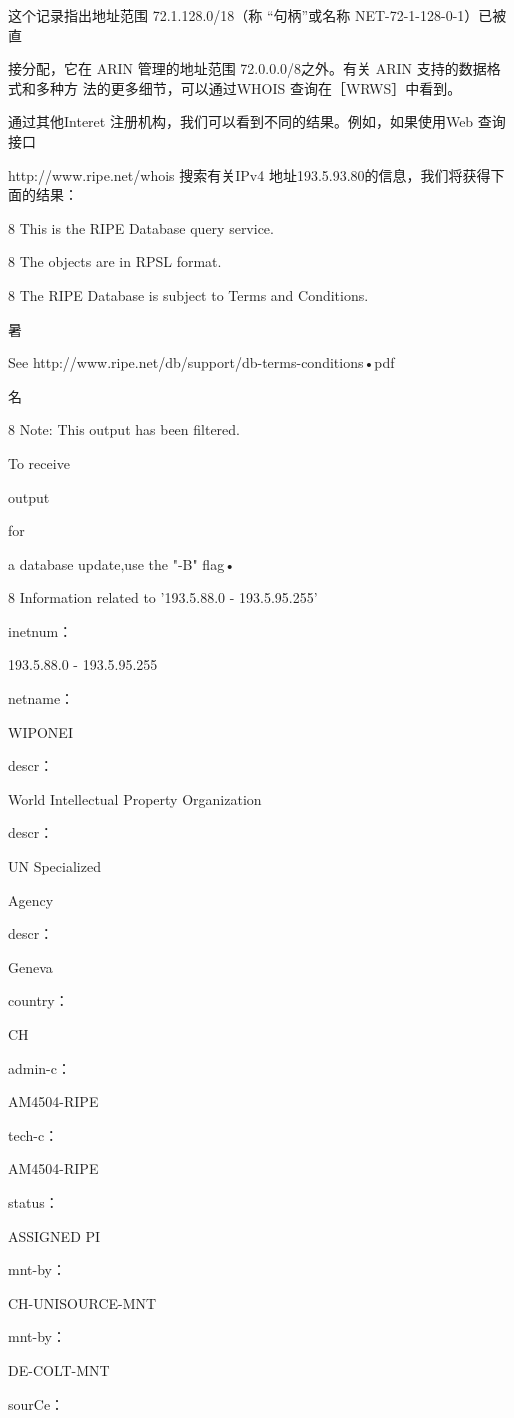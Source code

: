 这个记录指出地址范围 72.1.128.0/18（称 “句柄”或名称 NET-72-1-128-0-1）已被直

接分配，它在 ARIN 管理的地址范围 72.0.0.0/8之外。有关 ARIN 支持的数据格式和多种方
法的更多细节，可以通过WHOIS 查询在［WRWS］中看到。

通过其他Interet 注册机构，我们可以看到不同的结果。例如，如果使用Web 查询接口

http://www.ripe.net/whois 搜索有关IPv4 地址193.5.93.80的信息，我们将获得下面的结果：

8 This is the RIPE Database query service.

8 The objects are in RPSL format.

8 The RIPE Database is subject to Terms and Conditions.

暑

See http://www.ripe.net/db/support/db-terms-conditions•pdf

名

8 Note: This output has been filtered.

To receive

output

for

a database update,use the "-B" flag•

8 Information related to '193.5.88.0 - 193.5.95.255'

inetnum：

193.5.88.0 - 193.5.95.255

netname：

WIPONEI

descr：

World Intellectual Property Organization

descr：

UN Specialized

Agency

descr：

Geneva

country：

CH

admin-c：

AM4504-RIPE

tech-c：

AM4504-RIPE

status：

ASSIGNED PI

mnt-by：

CH-UNISOURCE-MNT

mnt-by：

DE-COLT-MNT

sourCe：

